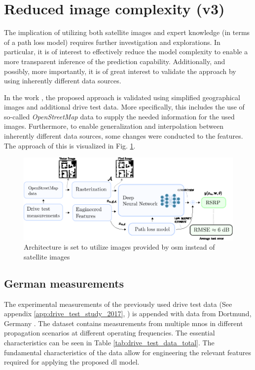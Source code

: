 \section{Reduced image complexity (v3)}\label{sec:osm_v3}
The implication of utilizing both satellite images and expert knowledge (in terms of a path loss model) requires further investigation and explorations. In particular, it is of interest to effectively reduce the model complexity to enable a more transparent inference of the prediction capability. Additionally, and possibly, more importantly, it is of great interest to validate the approach by using inherently different data sources. 

In the work \cite{Thrane2020DeepKnowledge}, the proposed approach is validated using simplified geographical images and additional drive test data. More specifically, this includes the use of so-called \emph{OpenStreetMap} data to supply the needed information for the used images. Furthermore, to enable generalization and interpolation between inherently different data sources, some changes were conducted to the features. The approach of this is visualized in Fig. \ref{fig:version3_architecture_figure}.

\begin{figure}
    \centering
    \includegraphics{chapters/part_pathloss/osm_images_paper/figures/version3_architecture_figure.eps}
    \caption{Architecture is set to utilize images provided by \gls{osm} instead of satellite images}
    \label{fig:version3_architecture_figure}
\end{figure}




\subsection{German measurements}

The experimental measurements of the previously used drive test data (See appendix \ref{app:drive_test_study_2017}, \cite{1xf4-eg98-19}) is appended with data from Dortmund, Germany \cite{SliwaEmpiricalNetworks}. The dataset contains measurements from multiple \glspl{mno} in different propagation scenarios at different operating frequencies. The essential characteristics can be seen in Table \ref{tab:drive_test_data_total}. The fundamental characteristics of the data allow for engineering the relevant features required for applying the proposed \gls{dl} model.

